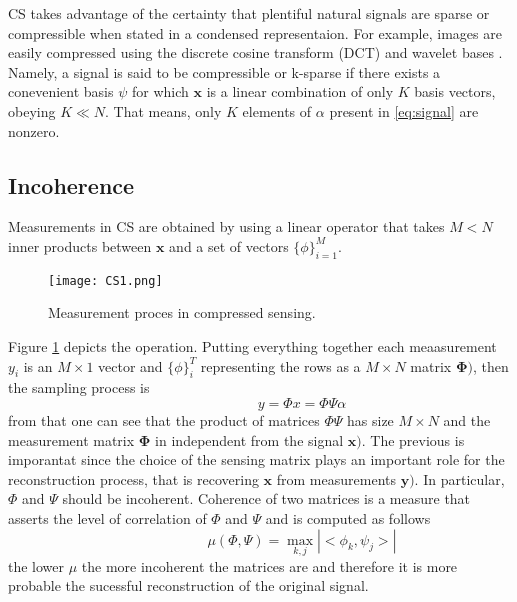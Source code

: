 CS takes advantage of the certainty that plentiful natural signals are sparse or compressible when stated in a condensed representaion. For example, images are easily compressed using the discrete cosine transform (DCT) and wavelet bases \cite{mallat1999wavelet}. Namely, a signal is said to be compressible or k-sparse if there exists a conevenient basis $\psi$ for which $\mathbf{x}$ is a linear combination of only $K$ basis vectors, obeying $K \ll N$. That means, only $K$ elements of $\alpha$ present in \ref{eq:signal} are nonzero. 

\subsection{Incoherence}
Measurements in CS are obtained by using a linear operator that takes $M < N$ inner products between $\mathbf{x}$ and a set of vectors $\{\phi\}_{i=1}^{M}$. \begin{figure}[tb] 
\centering 
\texttt{[image: CS1.png]} 
\caption[Compressed sensing measurement process]{Measurement proces in compressed sensing.}
\label{fig:csmea} 
\end{figure}
Figure \ref{fig:csmea} depicts the operation. Putting everything together each meaasurement $y_i$ is an $ M \times 1$ vector and $\{\phi\}_{i}^{T}$ representing the rows as a $ M \times N$ matrix $\mathbf{\Phi)}$, then the sampling process is
\begin{equation} \label{eq:signal2}
\hspace{3em} \hspace{3em} \hspace{3em} y = \Phi x = \Phi\Psi\alpha \hspace{3em}
\end{equation}    
from that one can see that the product of matrices $\Phi\Psi$ has size $ M \times N$ and the measurement matrix $\mathbf{\Phi}$ in independent from the signal $\mathbf{x)}$. The previous is imporantat since the choice of the sensing matrix plays an important role for the reconstruction process, that is recovering $\mathbf{x}$ from measurements $\mathbf{y)}$. In particular, $\Phi$ and $\Psi$ should be incoherent. Coherence of two matrices is a measure that asserts the level of correlation of $\Phi$ and $\Psi$ and is computed as follows
\begin{equation} \label{eq:signal3}
\hspace{3em} \hspace{3em} \hspace{3em} \mu(\Phi,\Psi) = \max_{k,j}|<\phi_k,\psi_j>|  \hspace{3em}
\end{equation}   
the lower $\mu$ the more incoherent the matrices are and therefore it is more probable the sucessful reconstruction of the original signal.

